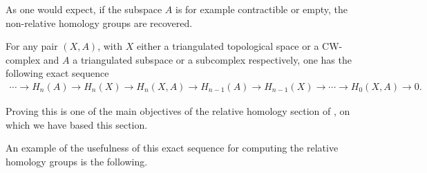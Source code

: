 \begin{nota}
    As one would expect, if the subspace $A$ is for example contractible or empty, the non-relative homology groups are recovered. %
\end{nota}
\bigskip

\begin{proposition}
\label{exact_sec_hom_rel}
    For any pair $(X,A)$, with $X$ either a triangulated topological space or a CW-complex and $A$ a triangulated subspace or a subcomplex respectively, one has the following exact sequence
    \begin{align*}
        \cdots \longrightarrow H_n(A) \longrightarrow H_n(X) \longrightarrow H_n(X,A) \longrightarrow H_{n-1}(A) \longrightarrow H_{n-1}(X) \longrightarrow \cdots \longrightarrow H_0(X,A) \longrightarrow 0.
    \end{align*}
\end{proposition}

Proving this is one of the main objectives of the relative homology section of \cite[p.~115]{hatcher2002}, on which we have based this section.

\bigskip

An example of the usefulness of this exact sequence for computing the relative homology groups is the following.

